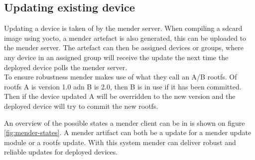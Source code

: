 \documentclass[../../main.tex]{subfiles}
\begin{document}
\subsection{Updating existing device}%
\label{sub:updating_existing_device}

Updating a device is taken of by the mender server. When compiling a sdcard image using yocto,
a mender artefact is also generated, this can be uploaded to the mender server.
The artefact can then be assigned devices or groups, where any device in an assigned group will
receive the update the next time the deployed device polls the mender server.\\

To ensure robustness mender makes use of what they call an A/B rootfs.
Of rootfs A is version 1.0 adn B is 2.0, then B is in use if it has been committed.
Then if the device updated A will be overridden to the new version and the deployed device will
try to commit the new rootfs.

An overview of the possible states a mender client can be in is shown on
figure \ref{fig:mender-states}.
A mender artifact can both be a update for a mender update module or a rootfs update.
With this system mender can deliver robust and reliable updates for deployed devices.
\end{document}
